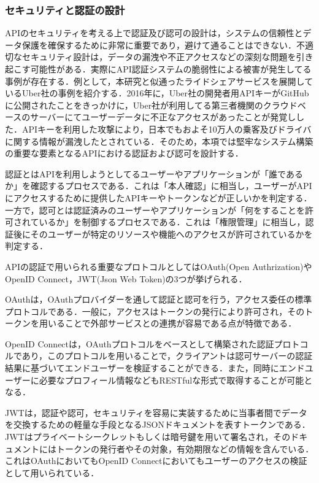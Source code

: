       \subsubsection{セキュリティと認証の設計}
        \label{sec:セキュリティと認証の設計}
          \par APIのセキュリティを考える上で認証及び認可の設計は，システムの信頼性とデータ保護を確保するために非常に重要であり，避けて通ることはできない．不適切なセキュリティ設計は，データの漏洩や不正アクセスなどの深刻な問題を引き起こす可能性がある．実際にAPI認証システムの脆弱性による被害が発生してる事例が存在する．例として，本研究と似通ったライドシェアサービスを展開しているUber社の事例を紹介する．2016年に，Uber社の開発者用APIキーがGitHubに公開されたことをきっかけに，Uber社が利用してる第三者機関のクラウドベースのサーバーにてユーザーデータに不正なアクセスがあったことが発覚しした．APIキーを利用した攻撃により，日本でもおよそ10万人の乗客及びドライバに関する情報が漏洩したとされている\cite{uber2016dataincident}．そのため，本項では堅牢なシステム構築の重要な要素となるAPIにおける認証および認可を設計する．
          \par 認証とはAPIを利用しようとしてるユーザーやアプリケーションが「誰であるか」を確認するプロセスである．これは「本人確認」に相当し，ユーザーがAPIにアクセスするために提供したAPIキーやトークンなどが正しいかを判定する．一方で，認可とは認証済みのユーザーやアプリケーションが「何をすることを許可されているか」を制御するプロセスである．これは「権限管理」に相当し，認証後にそのユーザーが特定のリソースや機能へのアクセスが許可されているかを判定する．
          \par APIの認証で用いられる重要なプロトコルとしてはOAuth(Open Authrization)やOpenID Connect，JWT(Json Web Token)の3つが挙げられる．
          \par OAuthは，OAuthプロバイダーを通して認証と認可を行う，アクセス委任の標準プロトコルである\cite{oauth}．一般に，アクセスはトークンの発行により許可され，そのトークンを用いることで外部サービスとの連携が容易である点が特徴である．
          \par OpenID Connectは，OAuthプロトコルをベースとして構築された認証プロトコルであり，このプロトコルを用いることで，クライアントは認可サーバーの認証結果に基づいてエンドユーザーを検証することができる．また，同時にエンドユーザーに必要なプロフィール情報などもRESTfulな形式で取得することが可能となる\cite{openidconnectjapan}．
          \par JWTは，認証や認可，セキュリティを容易に実装するために当事者間でデータを交換するための軽量な手段となるJSONドキュメントを表すトークンである\cite{mahindraka2020insights}．JWTはプライベートシークレットもしくは暗号鍵を用いて署名され，そのドキュメントにはトークンの発行者やその対象，有効期限などの情報を含んでいる．これはOAuthにおいてもOpenID Connectにおいてもユーザーのアクセスの検証として用いられている．
